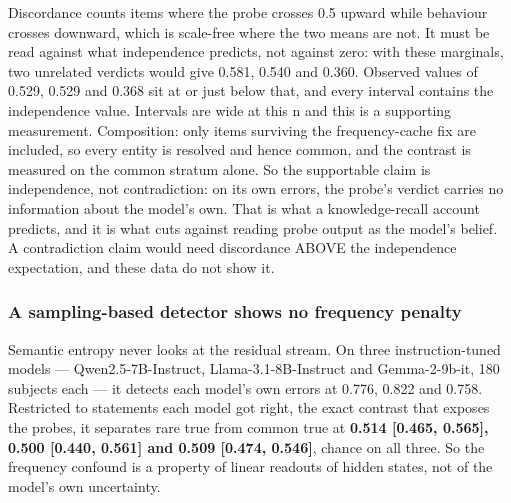 \documentclass[10pt]{article}
\begin{document}
\begin{table}[H]
\centering
\small
{}
\end{table}

Discordance counts items where the probe crosses 0.5 upward while behaviour crosses downward, which is scale-free where the two means are not. It must be read against what independence predicts, not against zero: with these marginals, two unrelated verdicts would give 0.581, 0.540 and 0.360. Observed values of 0.529, 0.529 and 0.368 sit at or just below that, and every interval contains the independence value. Intervals are wide at this n and this is a supporting measurement. Composition: only items surviving the frequency-cache fix are included, so every entity is resolved and hence common, and the contrast is measured on the common stratum alone. So the supportable claim is independence, not contradiction: on its own errors, the probe's verdict carries no information about the model's own. That is what a knowledge-recall account \citep{cheang2026really} predicts, and it is what cuts against reading probe output as the model's belief. A contradiction claim would need discordance ABOVE the independence expectation, and these data do not show it.

\subsubsection{A sampling-based detector shows no frequency penalty}

Semantic entropy \citep{farquhar2024semantic} never looks at the residual stream. On three instruction-tuned models --- Qwen2.5-7B-Instruct, Llama-3.1-8B-Instruct and Gemma-2-9b-it, 180 subjects each --- it detects each model's own errors at 0.776, 0.822 and 0.758. Restricted to statements each model got right, the exact contrast that exposes the probes, it separates rare true from common true at \textbf{0.514 [0.465, 0.565], 0.500 [0.440, 0.561] and 0.509 [0.474, 0.546]}, chance on all three. So the frequency confound is a property of linear readouts of hidden states, not of the model's own uncertainty.
\end{document}
